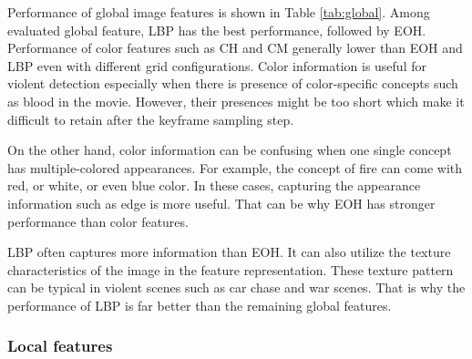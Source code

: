 \documentclass[twocolumn]{bmcart}%
\begin{document}
Performance of global image features is shown in Table \ref{tab:global}. Among evaluated global feature, LBP has the best performance, followed by EOH. Performance of color features such as CH and CM generally lower than EOH and LBP even with different grid configurations. Color information is useful for violent detection especially when there is presence of color-specific concepts such as blood in the movie. However, their presences might be too short which make it difficult to retain after the keyframe sampling step.

On the other hand, color information can be confusing when one single concept has multiple-colored appearances. For example, the concept of fire can come with red, or white, or even blue color. In these cases, capturing the appearance information such as edge is more useful. That can be why EOH has stronger performance than color features. 

LBP often captures more information than EOH. It can also utilize the texture characteristics of the image in the feature representation. These texture pattern can be typical in violent scenes such as car chase and war scenes. That is why the performance of LBP is far better than the remaining global features.
\subsubsection{Local features}
\end{document}
